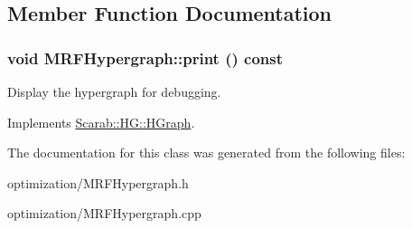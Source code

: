 \subsection{Member Function Documentation}
\hypertarget{classMRFHypergraph_aaac6b68c3ece41ddd1f8107e961879bc}{
\subsubsection[{print}]{\setlength{\rightskip}{0pt plus 5cm}void MRFHypergraph::print () const}}
\label{classMRFHypergraph_aaac6b68c3ece41ddd1f8107e961879bc}
Display the hypergraph for debugging. 

Implements \hyperlink{classScarab_1_1HG_1_1HGraph_ab5aa11c932b28864b56f28e0babbc1c1}{Scarab::HG::HGraph}.



The documentation for this class was generated from the following files:\begin{DoxyCompactItemize}
\item 
optimization/MRFHypergraph.h\item 
optimization/MRFHypergraph.cpp\end{DoxyCompactItemize}
